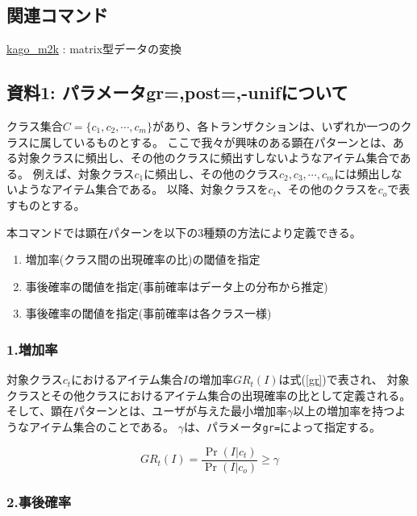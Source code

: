 \documentclass[a4paper]{jarticle}
\begin{document}
\subsection*{関連コマンド}

\hyperlink{kago\_m2k.pdf}{kago\_m2k} : matrix型データの変換

\subsection*{資料1: パラメータgr=,post=,-unifについて}
クラス集合$C=\{c_1,c_2,\cdots,c_m\}$があり、各トランザクションは、いずれか一つのクラスに属しているものとする。
ここで我々が興味のある顕在パターンとは、ある対象クラスに頻出し、その他のクラスに頻出すしないようなアイテム集合である。
例えば、対象クラス$c_1$に頻出し、その他のクラス$c_2,c_3,\cdots,c_m$には頻出しないようなアイテム集合である。
以降、対象クラスを$c_t$、その他のクラスを$c_o$で表すものとする。

本コマンドでは顕在パターンを以下の3種類の方法により定義できる。
\begin{enumerate}
\item 増加率(クラス間の出現確率の比)の閾値を指定
\item 事後確率の閾値を指定(事前確率はデータ上の分布から推定)
\item 事後確率の閾値を指定(事前確率は各クラス一様)
\end{enumerate}

\subsubsection*{1.増加率}

対象クラス$c_t$におけるアイテム集合$I$の増加率$GR_t(I)$は式(\ref{gr})で表され、
対象クラスとその他クラスにおけるアイテム集合の出現確率の比として定義される。
そして、顕在パターンとは、ユーザが与えた最小増加率$\gamma$以上の増加率を持つようなアイテム集合のことである。
$\gamma$は、パラメータ\verb|gr=|によって指定する。

\begin{equation}
GR_t(I)=\frac{\Pr(I|c_t)}{\Pr(I|c_o)} \ge \gamma \label{gr}
\end{equation}

\subsubsection*{2.事後確率}
\end{document}
